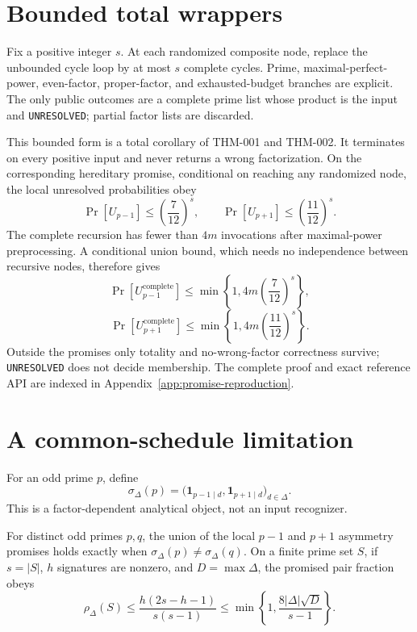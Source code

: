 \documentclass[11pt]{article}
\begin{document}
\section{Bounded total wrappers}

Fix a positive integer \(s\). At each randomized composite node, replace the
unbounded cycle loop by at most \(s\) complete cycles. Prime,
maximal-perfect-power, even-factor, proper-factor, and exhausted-budget
branches are explicit. The only public outcomes are a complete prime list
whose product is the input and \texttt{UNRESOLVED}; partial factor lists are
discarded.

This bounded form is a total corollary of THM-001 and THM-002. It terminates
on every positive input and never returns a wrong factorization. On the
corresponding hereditary promise, conditional on reaching any randomized
node, the local unresolved probabilities obey
\[
 \Pr[U_{p-1}]\le\left(\frac7{12}\right)^s,\qquad
 \Pr[U_{p+1}]\le\left(\frac{11}{12}\right)^s.
\]
The complete recursion has fewer than \(4m\) invocations after maximal-power
preprocessing. A conditional union bound, which needs no independence
between recursive nodes, therefore gives
\[
 \Pr[U^{\mathrm{complete}}_{p-1}]
 \le\min\left\{1,4m\left(\frac7{12}\right)^s\right\},
\]
\[
 \Pr[U^{\mathrm{complete}}_{p+1}]
 \le\min\left\{1,4m\left(\frac{11}{12}\right)^s\right\}.
\]
Outside the promises only totality and no-wrong-factor correctness survive;
\texttt{UNRESOLVED} does not decide membership. The complete proof and exact
reference API are indexed in Appendix~\ref{app:promise-reproduction}.

\section{A common-schedule limitation}

For an odd prime \(p\), define
\[
 \sigma_\Delta(p)=
 \bigl(\mathbf1_{p-1\mid d},\mathbf1_{p+1\mid d}\bigr)_{d\in\Delta}.
\]
This is a factor-dependent analytical object, not an input recognizer.

{}
For distinct odd primes \(p,q\), the union
of the local \(p-1\) and \(p+1\) asymmetry promises holds exactly when
\(\sigma_\Delta(p)\ne\sigma_\Delta(q)\).  On a finite prime set \(S\), if
\(s=|S|\), \(h\) signatures are nonzero, and \(D=\max\Delta\), the promised
pair fraction obeys
\[
 \rho_\Delta(S)\le
 \frac{h(2s-h-1)}{s(s-1)}
 \le \min\left\{1,\frac{8|\Delta|\sqrt D}{s-1}\right\}.
\]
\end{document}
